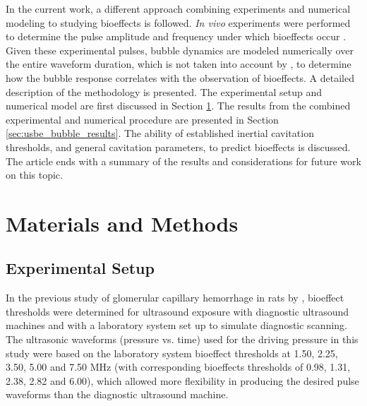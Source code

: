 In the current work, a different approach combining experiments and
numerical modeling to studying bioeffects is followed.  \emph{In vivo}
experiments were performed to determine the pulse amplitude and
frequency under which bioeffects occur \cite[]{Miller2008b}.  Given
these experimental pulses, bubble dynamics are modeled numerically
over the entire waveform duration, which is not taken into account by
\cite{Apfel1991}, to determine how the bubble response correlates with
the observation of bioeffects.  A detailed description of the
methodology is presented. The experimental setup and numerical model
are first discussed in Section \ref{sec:usbe_bubble_methods}. The results
from the combined experimental and numerical procedure are presented
in Section \ref{sec:usbe_bubble_results}. The ability of established
inertial cavitation thresholds, and general cavitation parameters, to
predict bioeffects is discussed. The article ends with a summary of
the results and considerations for future work on this topic.

\section{Materials and Methods}
\label{sec:usbe_bubble_methods}
\subsection{Experimental Setup}

In the previous study of glomerular capillary hemorrhage in rats by
\cite{Miller2008b}, bioeffect thresholds were determined for
ultrasound exposure with diagnostic ultrasound machines and with a
laboratory system set up to simulate diagnostic scanning.  The
ultrasonic waveforms (pressure vs. time) used for the driving pressure
in this study were based on the laboratory system bioeffect thresholds
at 1.50, 2.25, 3.50, 5.00 and 7.50 MHz (with corresponding bioeffects
thresholds of 0.98, 1.31, 2.38, 2.82 and 6.00), which allowed more
flexibility in producing the desired pulse waveforms than the
diagnostic ultrasound machine.

